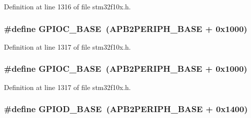 Definition at line 1316 of file stm32f10x.\+h.

\subsubsection[{\texorpdfstring{G\+P\+I\+O\+C\+\_\+\+B\+A\+SE}{GPIOC_BASE}}]{\setlength{\rightskip}{0pt plus 5cm}\#define G\+P\+I\+O\+C\+\_\+\+B\+A\+SE~({\bf A\+P\+B2\+P\+E\+R\+I\+P\+H\+\_\+\+B\+A\+SE} + 0x1000)}\hypertarget{group___peripheral__memory__map_ga26f267dc35338eef219544c51f1e6b3f}{}\label{group___peripheral__memory__map_ga26f267dc35338eef219544c51f1e6b3f}


Definition at line 1317 of file stm32f10x.\+h.

\subsubsection[{\texorpdfstring{G\+P\+I\+O\+C\+\_\+\+B\+A\+SE}{GPIOC_BASE}}]{\setlength{\rightskip}{0pt plus 5cm}\#define G\+P\+I\+O\+C\+\_\+\+B\+A\+SE~({\bf A\+P\+B2\+P\+E\+R\+I\+P\+H\+\_\+\+B\+A\+SE} + 0x1000)}\hypertarget{group___peripheral__memory__map_ga26f267dc35338eef219544c51f1e6b3f}{}\label{group___peripheral__memory__map_ga26f267dc35338eef219544c51f1e6b3f}


Definition at line 1317 of file stm32f10x.\+h.

\subsubsection[{\texorpdfstring{G\+P\+I\+O\+D\+\_\+\+B\+A\+SE}{GPIOD_BASE}}]{\setlength{\rightskip}{0pt plus 5cm}\#define G\+P\+I\+O\+D\+\_\+\+B\+A\+SE~({\bf A\+P\+B2\+P\+E\+R\+I\+P\+H\+\_\+\+B\+A\+SE} + 0x1400)}\hypertarget{group___peripheral__memory__map_ga1a93ab27129f04064089616910c296ec}{}\label{group___peripheral__memory__map_ga1a93ab27129f04064089616910c296ec}


